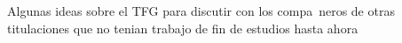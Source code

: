 Algunas ideas sobre el TFG para discutir con los compa~neros de otras
titulaciones que no tenian trabajo de fin de estudios hasta ahora

